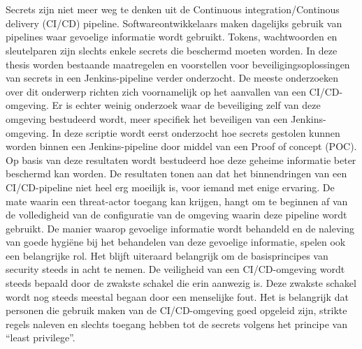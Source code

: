 \chapter*{}
Secrets zijn niet meer weg te denken uit de Continuous integration/Continous delivery (CI/CD) pipeline. Softwareontwikkelaars maken dagelijks gebruik van pipelines waar gevoelige informatie wordt gebruikt. Tokens, wachtwoorden en sleutelparen zijn slechts enkele secrets die beschermd moeten worden. In deze thesis worden bestaande maatregelen en voorstellen voor beveiligingsoplossingen van secrets in een Jenkins-pipeline verder onderzocht. De meeste onderzoeken over dit onderwerp richten zich voornamelijk op het aanvallen van een CI/CD-omgeving. Er is echter weinig onderzoek waar de beveiliging zelf van deze omgeving bestudeerd wordt, meer specifiek het beveiligen van een Jenkins-omgeving. In deze scriptie wordt eerst onderzocht hoe secrets gestolen kunnen worden binnen een Jenkins-pipeline door middel van een Proof of concept (POC). Op basis van deze resultaten wordt bestudeerd hoe deze geheime informatie beter beschermd kan worden. De resultaten tonen aan dat het binnendringen van een CI/CD-pipeline niet heel erg moeilijk is, voor iemand met enige ervaring. De mate waarin een threat-actor toegang kan krijgen, hangt om te beginnen af van de volledigheid van de configuratie van de omgeving waarin deze pipeline wordt gebruikt. De manier waarop gevoelige informatie wordt behandeld en de naleving van goede \mbox{hygiëne} bij het behandelen van deze gevoelige informatie, spelen ook een belangrijke rol. Het blijft uiteraard belangrijk om de basisprincipes van security steeds in acht te nemen. De veiligheid van een CI/CD-omgeving wordt steeds bepaald door de zwakste schakel die erin aanwezig is. Deze zwakste schakel wordt nog steeds meestal begaan door een menselijke fout. Het is belangrijk dat personen die gebruik maken van de CI/CD-omgeving goed opgeleid zijn, strikte regels naleven en slechts toegang hebben tot de secrets volgens het principe van “least privilege”.